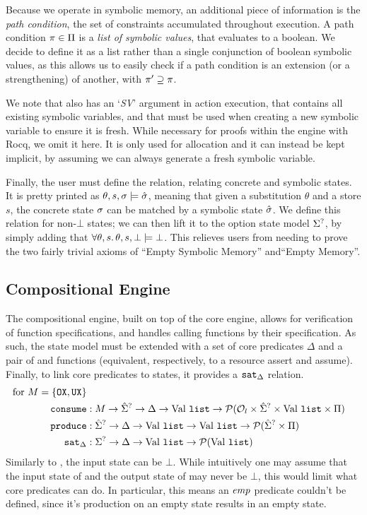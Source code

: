 Because we operate in symbolic memory, an additional piece of information is the \emph{path condition}, the set of constraints accumulated throughout execution. A path condition $\pi\in\Pi$ is a \emph{list of symbolic values}, that evaluates to a boolean. We decide to define it as a list rather than a single conjunction of boolean symbolic values, as this allows us to easily check if a path condition is an extension (or a strengthening) of another, with $\pi'\supseteq\pi$.

We note that \cite{cse2} also has an `\textit{SV}' argument in action execution, that contains all existing symbolic variables, and that must be used when creating a new symbolic variable to ensure it is fresh. While necessary for proofs within the engine with Rocq, we omit it here. It is only used for allocation and it can instead be kept implicit, by assuming we can always generate a fresh symbolic variable.

Finally, the user must define the  relation, relating concrete and symbolic states. It is pretty printed as $\theta,s,\sigma\models \hat{\sigma}$, meaning that given a substitution $\theta$ and a store $s$, the concrete state $\sigma$ can be matched by a symbolic state $\hat{\sigma}$. We define this relation for non-$\bot$ states; we can then lift it to the option state model $\Sigma^?$, by simply adding that $\forall \theta, s\ldotp \theta,s,\bot \models \bot$. This relieves users from needing to prove the two fairly trivial axioms of ``Empty Symbolic Memory'' and``Empty Memory''.

\subsection{Compositional Engine}

The compositional engine, built on top of the core engine, allows for verification of function specifications, and handles calling functions by their specification. As such, the state model must be extended with a set of core predicates $\Delta$ and a pair of \consume{} and \produce{} functions (equivalent, respectively, to a resource assert and assume). Finally, to link core predicates to states, it provides a $\texttt{sat}_\Delta$ relation.
\begin{align*}
	\text{for }M=\{\texttt{OX}, \texttt{UX}\}\\
	\texttt{consume} &: M\rightarrow \hat{\Sigma}^? \rightarrow \Delta \rightarrow \text{Val}~\texttt{list} \rightarrow {\cal P}({\cal O}_l \times \hat{\Sigma}^? \times \text{Val}~\texttt{list} \times \Pi) \\
	\texttt{produce} &: \hat{\Sigma}^? \rightarrow \Delta \rightarrow \text{Val}~\texttt{list} \rightarrow \text{Val}~\texttt{list} \rightarrow {\cal P}(\hat{\Sigma}^? \times \Pi)\\
	\texttt{sat}_\Delta &:\Sigma^? \rightarrow \Delta \rightarrow \text{Val}~\texttt{list} \rightarrow {\cal P}(\text{Val}~\texttt{list})
\end{align*}
Similarly to \execac, the input state can be $\bot$. While intuitively one may assume that the input state of \consume{} and the output state of \produce{} may never be $\bot$, this would limit what core predicates can do. In particular, this means an $\textit{emp}$ predicate couldn't be defined, since it's production on an empty state results in an empty state.

